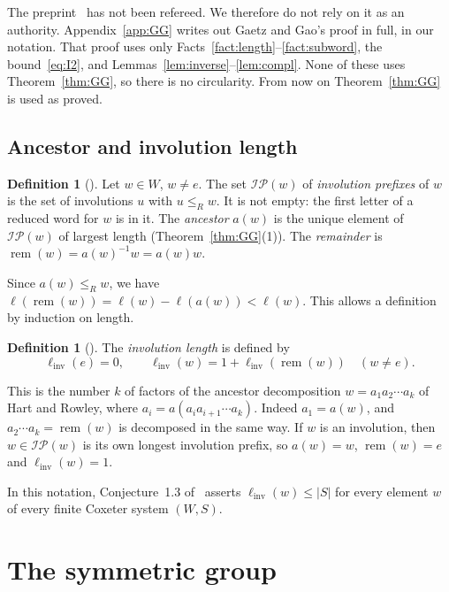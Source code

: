 \documentclass[11pt]{amsart}
\theoremstyle{definition}
\newtheorem{definition}[theorem]{Definition}
\theoremstyle{remark}
\numberwithin{equation}{section}
\newcommand{\linv}{\ell_{\mathrm{inv}}}
\newcommand{\IP}{\mathcal{IP}}
\newcommand{\leR}{\le_R}
\newcommand{\abs}[1]{\lvert #1\rvert}
\DeclareMathOperator{\rem}{rem}
\begin{document}
The preprint~\cite{GG} has not been refereed. We therefore do not rely on it as an authority. Appendix~\ref{app:GG} writes out Gaetz and Gao's proof in full, in our notation. That proof uses only Facts~\ref{fact:length}--\ref{fact:subword}, the bound~\eqref{eq:I2}, and Lemmas~\ref{lem:inverse}--\ref{lem:compl}. None of these uses Theorem~\ref{thm:GG}, so there is no circularity. From now on Theorem~\ref{thm:GG} is used as proved.

\subsection{Ancestor and involution length}

\begin{definition}[{\cite{HR}}]\label{def:ancestor}
Let \(w\in W\), \(w\neq e\). The set \(\IP(w)\) of \emph{involution prefixes} of \(w\) is the set of involutions \(u\) with \(u\leR w\). It is not empty: the first letter of a reduced word for \(w\) is in it. The \emph{ancestor} \(a(w)\) is the unique element of \(\IP(w)\) of largest length (Theorem~\ref{thm:GG}(1)). The \emph{remainder} is \(\rem(w)=a(w)^{-1}w=a(w)w\).
\end{definition}

Since \(a(w)\leR w\), we have \(\ell(\rem(w))=\ell(w)-\ell(a(w))<\ell(w)\). This allows a definition by induction on length.

\begin{definition}[{\cite{HR}}]\label{def:linv}
The \emph{involution length} is defined by
\begin{equation}\label{eq:linv}
\linv(e)=0,\qquad \linv(w)=1+\linv(\rem(w))\quad (w\neq e).
\end{equation}
\end{definition}

This is the number \(k\) of factors of the ancestor decomposition \(w=a_1a_2\cdots a_k\) of Hart and Rowley, where \(a_i=a(a_ia_{i+1}\cdots a_k)\). Indeed \(a_1=a(w)\), and \(a_2\cdots a_k=\rem(w)\) is decomposed in the same way. If \(w\) is an involution, then \(w\in\IP(w)\) is its own longest involution prefix, so \(a(w)=w\), \(\rem(w)=e\) and \(\linv(w)=1\).

In this notation, Conjecture~1.3 of~\cite{HR} asserts \(\linv(w)\le\abs{S}\) for every element \(w\) of every finite Coxeter system \((W,S)\).

\section{The symmetric group}\label{sec:SN}
\end{document}
